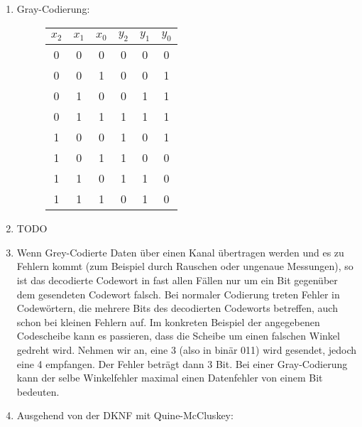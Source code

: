 \documentclass[DIN, pagenumber=false, fontsize=11pt, parskip=half]{scrartcl}
\begin{document}
    \subsection{}
    \begin{enumerate}[label=(\alph*)]
        \item 
            Gray-Codierung:
            \begin{figure}[H]
                \centering
                \begin{tabular}{ccc|ccc}
                    \toprule
                    $x_2$ & $x_1$ & $x_0$ & $y_2$ & $y_1$ & $y_0$ \\
                    \midrule
                    0 & 0 & 0 & 0 & 0 & 0\\
                    0 & 0 & 1 & 0 & 0 & 1\\
                    0 & 1 & 0 & 0 & 1 & 1\\
                    0 & 1 & 1 & 1 & 1 & 1\\
                    1 & 0 & 0 & 1 & 0 & 1\\
                    1 & 0 & 1 & 1 & 0 & 0\\
                    1 & 1 & 0 & 1 & 1 & 0\\
                    1 & 1 & 1 & 0 & 1 & 0\\
                    \bottomrule
                \end{tabular}
            \end{figure}
        \item TODO
        \item Wenn Grey-Codierte Daten über einen Kanal übertragen werden und
            es zu Fehlern kommt (zum Beispiel durch Rauschen oder ungenaue Messungen), so ist das decodierte Codewort in fast allen Fällen nur um ein
            Bit gegenüber dem gesendeten Codewort falsch. Bei \glqq{}normaler\grqq{} Codierung treten Fehler in Codewörtern, die mehrere Bits des decodierten Codeworts betreffen, auch schon bei kleinen Fehlern auf.
			Im konkreten Beispiel der angegebenen Codescheibe kann es passieren, dass die Scheibe um einen falschen Winkel gedreht wird. Nehmen wir an, eine 3 (also in binär 011) wird \glqq{}gesendet\grqq{}, jedoch eine 4 \glqq{}empfangen\grqq{}. Der Fehler beträgt dann 3 Bit. Bei einer Gray-Codierung kann der selbe Winkelfehler maximal einen Datenfehler von einem Bit bedeuten.
        \item 
            Ausgehend von der DKNF mit Quine-McCluskey:
            \begin{eqnarray*}

\end{eqnarray*}
\end{enumerate}
\end{document}

